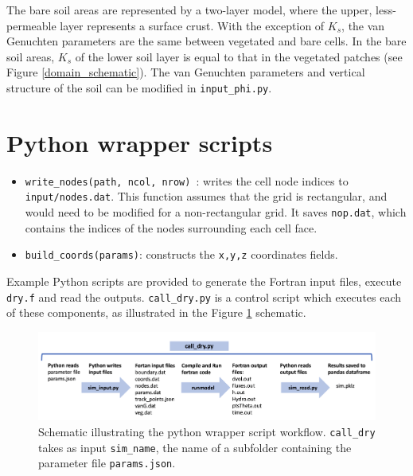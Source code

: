 \documentclass{article}
\newcommand{\code}[1]{\texttt{#1}}
\begin{document}
The bare soil areas are represented by a two-layer model, where the upper, less-permeable  layer represents a surface crust.  With the exception of $K_{s}$, the van Genuchten parameters are the same between vegetated and bare cells. In the bare soil areas, $K_{s}$ of the lower soil layer is  equal to that in the vegetated patches (see Figure \ref{domain_schematic}).
The van Genuchten parameters and vertical structure of the soil can be modified in \code{input\_phi.py}.


\section{Python wrapper scripts}
\label{python_wrap}

\begin{itemize}
\item \code{write\_nodes(path, ncol, nrow)  }: writes the cell node indices to \code{input/nodes.dat}.  
    This function assumes that the grid is rectangular, and would need to be modified for a non-rectangular grid. 
       It saves \code{nop.dat}, which contains the indices of the nodes surrounding each cell face.
\item \code{build\_coords(params)}: constructs the \code{x,y,z} coordinates fields. 
\end{itemize}



Example Python scripts are provided to generate the Fortran input files, execute \code{dry.f} and read the outputs.   \code{call\_dry.py} is a control script which executes each of these components, as illustrated in the Figure \ref{schematic} schematic.

 \begin{figure}[h]
 \centering
\includegraphics[width=38pc]{grid/schematic.png}
 \caption{Schematic illustrating the python wrapper script workflow. \code{call\_dry} takes as input \code{sim\_name}, the name of a subfolder containing the parameter file \code{params.json}.}
 \label{schematic}
 \end{figure}
 
\end{document}
